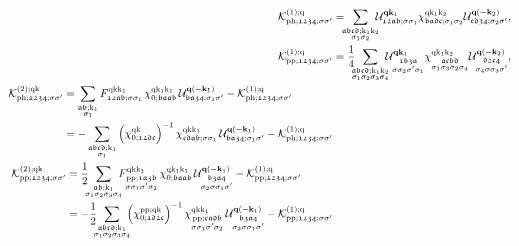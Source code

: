 \documentclass[../../main.tex]{subfiles}
\begin{document}
\begin{align}
 	\mathcal{K}^{(1);\q}_{\ph;\mathfrak{1234};\ss'}&=\!\!\!\sum_{\substack{\mathfrak{abcd};\k_1\k_2\\\sigma_1\sigma_2}} \!\!\!\mathcal{U}^{\vv{q}\vv{k}_1}_{\mathfrak{12ab};\ss_1}\chi^{\q\k_1\k_2}_{\mathfrak{badc};\sigma_1\sigma_2}\mathcal{U}^{\vv{q}(-\vv{k}_2)}_{\mathfrak{cd34};\sigma_2\sigma'},\label{eq:kernel_1}\\
 	\mathcal{K}^{(1);\q}_{\pp;\mathfrak{1234};\ss'}&=\frac14\!\!\!\sum_{\substack{\mathfrak{abcd};\k_1\k_2\\\sigma_1\sigma_2\sigma_3\sigma_4}} \!\!\!\mathcal{U}^{\vv{q}\vv{k}_1}_{\substack{\mathfrak{1b3a}\\\ss_2\sigma'\sigma_1}}\chi^{\q\k_1\k_2}_{\substack{\mathfrak{acbd}\\\sigma_1\sigma_3\sigma_2\sigma_4}}\mathcal{U}^{\vv{q}(-\vv{k}_2)}_{\substack{\mathfrak{d2c4}\\\sigma_4\sigma\sigma_3\sigma'}},\label{eq:kernel_1_pp}\\
\begin{split}\label{eq:kernel_2}
	\mathcal{K}^{(2);\q\k}_{\ph;\mathfrak{1234};\ss'}&=\sum_{\substack{\mathfrak{ab};\k_1\\\sigma_1}} F^{\q\k\k_1}_{\mathfrak{12ab};\ss_1}\,\chi^{\q\k_1\k_1}_{0;\mathfrak{baab}}\,\mathcal{U}^{\vv{q}(-\vv{k}_1)}_{\mathfrak{ba34};\sigma_1\sigma'}-\mathcal{K}^{(1);\q}_{\ph;\mathfrak{1234};\ss'}\\
	&=-\sum_{\substack{\mathfrak{abcd};\k_1\\\sigma_1}} \left (\chi_{0;\mathfrak{12dc}}^{\q\k}\right )^{-1}\chi^{\q\k\k_1}_{\mathfrak{cdab};\ss_1}\,\mathcal{U}^{\vv{q}(-\vv{k}_1)}_{\mathfrak{ba34};\sigma_1\sigma'}-\mathcal{K}^{(1);\q}_{\ph;\mathfrak{1234};\ss'}
\end{split}\\
\begin{split}\label{eq:kernel_2_pp}
	\mathcal{K}^{(2);\q\k}_{\pp;\mathfrak{1234};\ss'}&=\frac12\!\!\!\sum_{\substack{\mathfrak{ab};\k_1\\\sigma_1\sigma_2\sigma_3\sigma_4}} \!\!\!F^{\q\k\k_1}_{\substack{\pp;\mathfrak{1a3b}\\\sigma\sigma_1\sigma'\sigma_2}}\,\chi^{\q\k_1\k_1}_{0;\mathfrak{baab}}\,\mathcal{U}^{\vv{q}(-\vv{k}_1)}_{\substack{\mathfrak{b3a4}\\\sigma_2\sigma\sigma_1\sigma'}}-\mathcal{K}^{(1);\q}_{\pp;\mathfrak{1234};\ss'}\\
	&=-\frac12\!\!\!\sum_{\substack{\mathfrak{abcd};\k_1\\\sigma_1\sigma_2\sigma_3\sigma_4}}\!\!\! \left (\chi_{0;\mathfrak{1d2c}}^{\pp;\q\k}\right )^{-1}\chi^{\q\k\k_1}_{\substack{\pp;\mathfrak{cadb}\\\sigma\sigma_1\sigma'\sigma_2}}\,\mathcal{U}^{\vv{q}(-\vv{k}_1)}_{\substack{\mathfrak{b3a4}\\\sigma_2\sigma\sigma_1\sigma'}}-\mathcal{K}^{(1);\q}_{\pp;\mathfrak{1234};\ss'}
\end{split}
\end{align}
\end{document}
